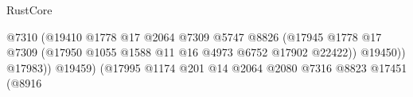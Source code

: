 \begin{lexlean}{RustCore}
\begin{coremodule}
                                                                      @7310
                                                                      (@19410
                                                                        @1778
                                                                        @17
                                                                        @2064
                                                                        @7309
                                                                        @5747
                                                                        @8826
                                                                        (@17945
                                                                          @1778
                                                                          @17
                                                                          @7309
                                                                          (@17950
                                                                            @1055
                                                                            @1588
                                                                            @11
                                                                            @16
                                                                            @4973
                                                                            @6752
                                                                            @17902
                                                                            @22422))
                                                                        @19450))
                                                                    @17983))
                                                                @19459)
                                                              (@17995
                                                                @1174
                                                                @201
                                                                @14
                                                                @2064
                                                                @2080
                                                                @7316
                                                                @8823
                                                                @17451
                                                                (@8916

\end{coremodule}
\end{lexlean}
